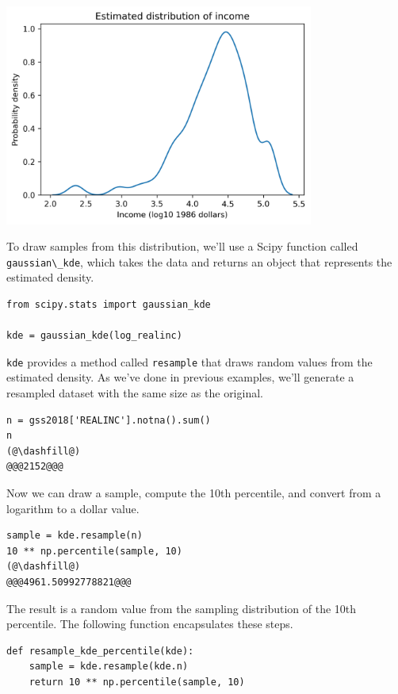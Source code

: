 \begin{center}
\includegraphics[width=4in]{12_bootstrap_files/12_bootstrap_115_0.png}
\end{center}

To draw samples from this distribution, we'll use a Scipy function
called \passthrough{\lstinline!gaussian\_kde!}, which takes the data and
returns an object that represents the estimated density.

\begin{lstlisting}[]
from scipy.stats import gaussian_kde

kde = gaussian_kde(log_realinc)
\end{lstlisting}

\passthrough{\lstinline!kde!} provides a method called
\passthrough{\lstinline!resample!} that draws random values from the
estimated density. As we've done in previous examples, we'll generate a
resampled dataset with the same size as the original.

\begin{lstlisting}[]
n = gss2018['REALINC'].notna().sum()
n
(@\dashfill@)
@@@2152@@@
\end{lstlisting}

Now we can draw a sample, compute the 10th percentile, and convert from
a logarithm to a dollar value.

\begin{lstlisting}[]
sample = kde.resample(n)
10 ** np.percentile(sample, 10)
(@\dashfill@)
@@@4961.50992778821@@@
\end{lstlisting}

The result is a random value from the sampling distribution of the 10th
percentile. The following function encapsulates these steps.

\begin{lstlisting}[]
def resample_kde_percentile(kde):
    sample = kde.resample(kde.n)
    return 10 ** np.percentile(sample, 10)
\end{lstlisting}

